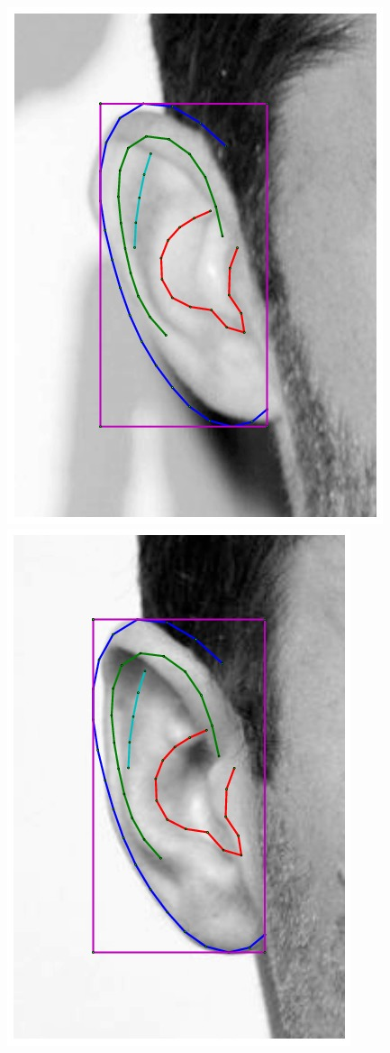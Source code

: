 \begin{figure}[!t]
    \includegraphics[height=\flowhh]{resources/Ear_Deformable_Model/fittings/initial_0024}
    \includegraphics[height=\flowhh]{resources/Ear_Deformable_Model/fittings/initial_0025}

\end{figure}
